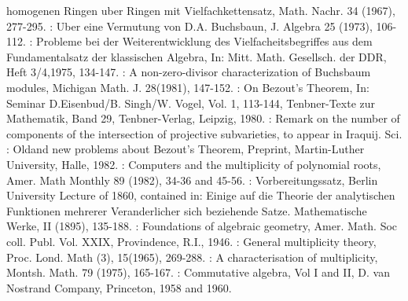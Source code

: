 \begin{thebibliography}{99}
  homogenen Ringen uber Ringen mit Vielfachkettensatz,
  Math. Nachr. 34 (1967), 277-295. 
:   Uber eine Vermutung von D.A. Buchsbaun,
  J. Algebra 25 (1973), 106-112. 
:   Probleme bei der Weiterentwicklung des
  Vielfacheitsbegriffes aus dem Fundamentalsatz der klassischen
  Algebra, In: Mitt. Math. Gesellsch. der DDR, Heft 3/4,1975,
  134-147. 
:   A non-zero-divisor characterization of
  Buchsbaum modules, Michigan Math. J. 28(1981), 147-152. 
:   On Bezout's Theorem, In: Seminar
  D.Eisenbud/B. Singh/W. Vogel, Vol. 1,  113-144, Tenbner-Texte
  zur Mathematik, Band 29, Tenbner-Verlag, Leipzig, 1980. 
:   Remark on the number of components of the
  intersection of projective subvarieties, to appear in Iraquij. Sci. 
:   Old\pageoriginale and new problems about Bezout's
  Theorem, Preprint, Martin-Luther University, Halle, 1982. 
:   Computers and the multiplicity of
  polynomial roots, Amer. Math Monthly 89 (1982), 34-36 and
  45-56. 
:  Vorbereitungssatz, Berlin University
  Lecture of 1860, contained in:  Einige auf die Theorie der
  analytischen Funktionen mehrerer Veranderlicher sich beziehende
  Satze. Mathematische Werke, II (1895), 135-188. 
:  Foundations of algebraic geometry,
  Amer. Math. Soc coll. Publ. Vol. XXIX, Provindence, R.I., 1946. 
:  General multiplicity theory,
  Proc. Lond. Math (3), 15(1965), 269-288. 
:  A characterisation of multiplicity,
  Montsh. Math. 79 (1975), 165-167. 
:  Commutative algebra, Vol
  I and II, D. van Nostrand Company, Princeton, 1958 and
  1960. 
\end{thebibliography}
